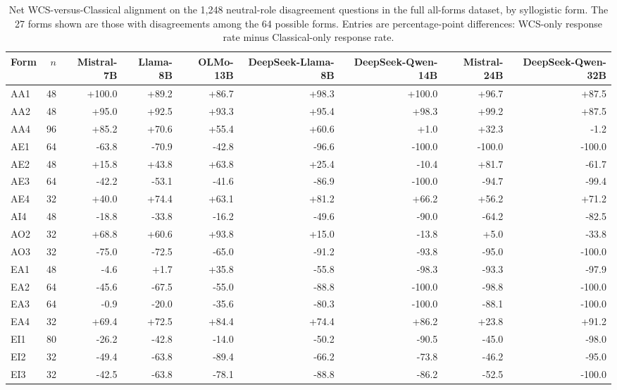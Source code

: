 \begin{table}[htbp]
\centering
\scriptsize
\setlength{\tabcolsep}{3pt}
\caption{Net WCS-versus-Classical alignment on the 1,248 neutral-role disagreement questions in the full all-forms dataset, by syllogistic form. The 27 forms shown are those with disagreements among the 64 possible forms. Entries are percentage-point differences: WCS-only response rate minus Classical-only response rate.}
\label{tab:alignment-by-syllogistic-form-appendix-final2}
\begin{tabular}{lrrrrrrrr}
\toprule
Form & $n$ & Mistral-7B & Llama-8B & OLMo-13B & DeepSeek-Llama-8B & DeepSeek-Qwen-14B & Mistral-24B & DeepSeek-Qwen-32B \\
\midrule
AA1 & 48 & +100.0 & +89.2 & +86.7 & +98.3 & +100.0 & +96.7 & +87.5 \\
AA2 & 48 & +95.0 & +92.5 & +93.3 & +95.4 & +98.3 & +99.2 & +87.5 \\
AA4 & 96 & +85.2 & +70.6 & +55.4 & +60.6 & +1.0 & +32.3 & -1.2 \\
AE1 & 64 & -63.8 & -70.9 & -42.8 & -96.6 & -100.0 & -100.0 & -100.0 \\
AE2 & 48 & +15.8 & +43.8 & +63.8 & +25.4 & -10.4 & +81.7 & -61.7 \\
AE3 & 64 & -42.2 & -53.1 & -41.6 & -86.9 & -100.0 & -94.7 & -99.4 \\
AE4 & 32 & +40.0 & +74.4 & +63.1 & +81.2 & +66.2 & +56.2 & +71.2 \\
AI4 & 48 & -18.8 & -33.8 & -16.2 & -49.6 & -90.0 & -64.2 & -82.5 \\
AO2 & 32 & +68.8 & +60.6 & +93.8 & +15.0 & -13.8 & +5.0 & -33.8 \\
AO3 & 32 & -75.0 & -72.5 & -65.0 & -91.2 & -93.8 & -95.0 & -100.0 \\
EA1 & 48 & -4.6 & +1.7 & +35.8 & -55.8 & -98.3 & -93.3 & -97.9 \\
EA2 & 64 & -45.6 & -67.5 & -55.0 & -88.8 & -100.0 & -98.8 & -100.0 \\
EA3 & 64 & -0.9 & -20.0 & -35.6 & -80.3 & -100.0 & -88.1 & -100.0 \\
EA4 & 32 & +69.4 & +72.5 & +84.4 & +74.4 & +86.2 & +23.8 & +91.2 \\
EI1 & 80 & -26.2 & -42.8 & -14.0 & -50.2 & -90.5 & -45.0 & -98.0 \\
EI2 & 32 & -49.4 & -63.8 & -89.4 & -66.2 & -73.8 & -46.2 & -95.0 \\
EI3 & 32 & -42.5 & -63.8 & -78.1 & -88.8 & -86.2 & -52.5 & -100.0 \\

\end{tabular}
\end{table}
